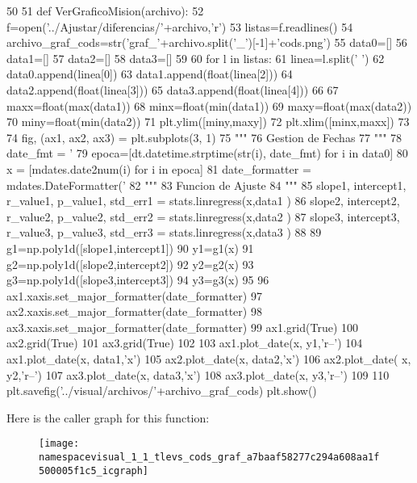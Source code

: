 \begin{DoxyCode}
50 
51 def VerGraficoMision(archivo):
52     f=open('../Ajustar/diferencias/'+archivo,'r')
53     listas=f.readlines()
54     archivo_graf_cods=str('graf_'+archivo.split('_')[-1]+'cods.png')
55     data0=[]
56     data1=[]
57     data2=[]
58     data3=[]
59     
60     for l in listas:
61         linea=l.split(' ')
62         data0.append(linea[0])
63         data1.append(float(linea[2]))
64         data2.append(float(linea[3]))
65         data3.append(float(linea[4]))
66                      
67     maxx=float(max(data1))
68     minx=float(min(data1))
69     maxy=float(max(data2))
70     miny=float(min(data2))
71     plt.ylim([miny,maxy])
72     plt.xlim([minx,maxx])
73     
74     fig, (ax1, ax2, ax3) = plt.subplots(3, 1)
75     """
76     Gestion de Fechas
77     """
78     date_fmt = '%
79     epoca=[dt.datetime.strptime(str(i), date_fmt) for i in data0]
80     x = [mdates.date2num(i) for i in epoca]
81     date_formatter = mdates.DateFormatter('%
82     """
83     Funcion de Ajuste
84     """
85     slope1, intercept1, r_value1, p_value1, std_err1 = stats.linregress(x,data1
      )
86     slope2, intercept2, r_value2, p_value2, std_err2 = stats.linregress(x,data2
      )
87     slope3, intercept3, r_value3, p_value3, std_err3 = stats.linregress(x,data3
      )
88 
89     g1=np.poly1d([slope1,intercept1])
90     y1=g1(x)
91     g2=np.poly1d([slope2,intercept2])
92     y2=g2(x)
93     g3=np.poly1d([slope3,intercept3])
94     y3=g3(x)
95 
96     ax1.xaxis.set_major_formatter(date_formatter)
97     ax2.xaxis.set_major_formatter(date_formatter)
98     ax3.xaxis.set_major_formatter(date_formatter)
99     ax1.grid(True)
100     ax2.grid(True)
101     ax3.grid(True)
102     
103     ax1.plot_date(x, y1,'r--')
104     ax1.plot_date(x, data1,'x')
105     ax2.plot_date(x, data2,'x')
106     ax2.plot_date( x, y2,'r--')
107     ax3.plot_date(x, data3,'x')
108     ax3.plot_date(x, y3,'r--')
109 
110     plt.savefig('../visual/archivos/'+archivo_graf_cods)
    plt.show()\end{DoxyCode}


\-Here is the caller graph for this function\-:\nopagebreak
\begin{figure}[H]
\begin{center}
\leavevmode
\texttt{[image: namespacevisual\_1\_1\_tlevs\_cods\_graf\_a7baaf58277c294a608aa1f500005f1c5\_icgraph]}
\end{center}
\end{figure}


